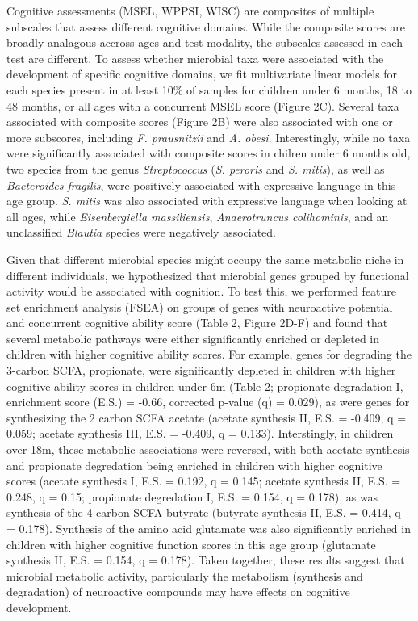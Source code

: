 \documentclass{article}
\begin{document}
Cognitive assessments (MSEL, WPPSI, WISC)
are composites of multiple subscales that assess different cognitive domains.
While the composite scores are broadly analagous accross ages and test modality,
the subscales assessed in each test are different.
To assess whether microbial taxa were associated with
the development of specific cognitive domains,
we fit multivariate linear models for each species present in at least 10\%
of samples for children under 6 months, 18 to 48 months, or all ages
with a concurrent MSEL score (Figure 2C).
Several taxa associated with composite scores (Figure 2B)
were also associated with one or more subscores, including
\textit{F. prausnitzii} and \textit{A. obesi}.
Interestingly, while no taxa were significantly associated
with composite scores in chilren under 6 months old,
two species from the genus \textit{Streptococcus}
(\textit{S. peroris} and \textit{S. mitis}), as well as
\textit{Bacteroides fragilis}, were positively associated
with expressive language in this age group.
\textit{S. mitis} was also associated with expressive language
when looking at all ages, while \textit{Eisenbergiella massiliensis},
\textit{Anaerotruncus colihominis}, and an unclassified \textit{Blautia}
species were negatively associated. %


Given that different microbial species might occupy the same metabolic
niche in different individuals, we hypothesized that microbial genes
grouped by functional activity would be associated with cognition. To
test this, we performed feature set enrichment analysis (FSEA) on groups
of genes with neuroactive potential
\cite{valles-colomerNeuroactivePotentialHuman2019}
and concurrent cognitive ability score (Table 2, Figure 2D-F) and found that
several metabolic pathways were either significantly enriched or depleted in
children with higher cognitive ability scores.
For example, genes for degrading the 3-carbon SCFA, propionate,
were significantly depleted in children with higher cognitive ability
scores in children under 6m (Table 2; propionate degradation I,
enrichment score (E.S.) = -0.66, corrected p-value (q)
= 0.029), as were genes for synthesizing the 2 carbon SCFA acetate
(acetate synthesis II, E.S. = -0.409, q = 0.059; acetate synthesis
III, E.S. = -0.409, q = 0.133).
Interstingly, in children over 18m,
these metabolic associations were reversed, with both acetate synthesis
and propionate degredation being enriched in children
with higher cognitive scores
(acetate synthesis I, E.S. = 0.192, q = 0.145;
acetate synthesis II, E.S. = 0.248, q = 0.15;
propionate degredation I, E.S. = 0.154, q = 0.178),
as was synthesis of the 4-carbon SCFA butyrate
(butyrate synthesis II, E.S. = 0.414, q = 0.178).
Synthesis of the amino acid
glutamate was also significantly enriched in children with
higher cognitive function scores in this age group (glutamate synthesis II, E.S. = 0.154, 
q = 0.178). Taken together, these results suggest that
microbial metabolic activity, particularly the metabolism (synthesis and
degradation) of neuroactive compounds may have effects on cognitive
development.
\end{document}
